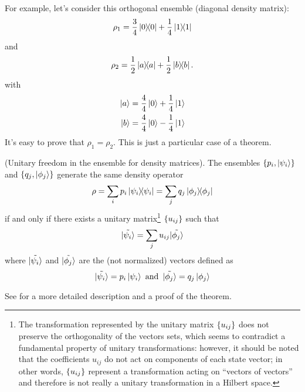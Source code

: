 For example, let's consider this orthogonal ensemble (diagonal density matrix):
\[
  \rho_1 = \frac{3}{4}\ketbra{0}{0} + \frac{1}{4}\ketbra{1}{1}
\]
and
\[
  \rho_2 = \frac{1}{2}\ketbra{a}{a} + \frac{1}{2}\ketbra{b}{b}\text{.}
\]
with
\begin{align*}
  \ket{a} &= \frac{4}{4}\ket{0} + \frac{1}{4}\ket{1} \\
  \ket{b} &= \frac{4}{4}\ket{0} - \frac{1}{4}\ket{1}
\end{align*}
It's easy to prove that $\rho_1 = \rho_2$. This is just a particular
case of a theorem.
\begin{theorem}{(Unitary freedom in the ensemble for density matrices).}
  The ensembles
  $\left\{p_i, \ket{\psi_i}\right\}$ and $\left\{q_{j}, \ket{\phi_j}\right\}$
  generate the same density operator
  $$\rho = \sum_i p_i \ketbra{\psi_i} = \sum_j q_j \ketbra{\phi_j}$$
  if and only if there exists
  a unitary matrix\footnote{
    The transformation represented by the unitary matrix $\left\{u_{ij}\right\}$
    does not preserve the orthogonality of the vectors sets,
    which seems to contradict a fundamental property of unitary
    transformations: however, it should be noted that the coefficients
    $u_{ij}$ do not act on components of each state vector; in other
    words, $\left\{u_{ij}\right\}$ represent a transformation acting
    on ``vectors of vectors'' and therefore is not really a unitary
    transformation in a Hilbert space.
  }
  $\left\{u_{ij}\right\}$ such that
  \[
    \tilde{\ket{\psi_i}} = \sum_j u_{ij}\tilde{\ket{\phi_j}}
  \]
  where $\tilde{\ket{\psi_i}}$ and $\tilde{\ket{\phi_j}}$
  are the (not normalized) vectors defined as
  \[
    \tilde{\ket{\psi_i}} = p_{i}\ket{\psi_i}
    \text{ and }\,
    \tilde{\ket{\phi_j}} = q_{j}\ket{\phi_j}
  \]
\end{theorem}
See \cite[Theorem 2.6 and introductory example]{NielsenChuang}
for a more detailed description and a proof of the theorem.
